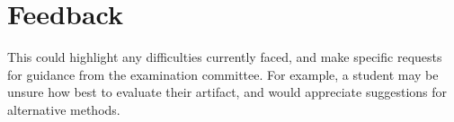 \chapter*{Feedback}\label{C:feed} 

This could highlight any difficulties currently faced, and make specific requests for guidance from the examination committee. For example, a student may be unsure how best to evaluate their artifact, and would appreciate suggestions for alternative methods. 
